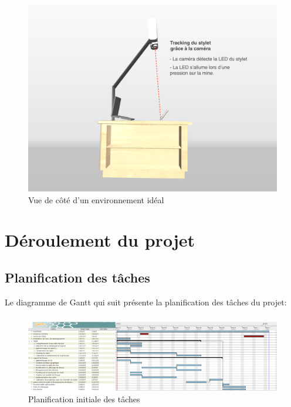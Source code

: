 \documentclass[11pt,a4paper,oldfontcommands]{memoir}
\begin{document}
\begin{figure}[H]
\centering
\includegraphics[angle=90, scale=0.15]{images/drawing-environment-side.png}
\caption{Vue de côté d'un environnement idéal}
\end{figure}

\newpage

\section{Déroulement du projet}

\subsection{Planification des tâches}

Le diagramme de Gantt qui suit présente la planification des tâches du projet:

\begin{figure}[H]
\centering
\includegraphics[angle=90, scale=0.3]{images/planification.png}
\caption{Planification initiale des tâches}
\end{figure}

\newpage
\end{document}

